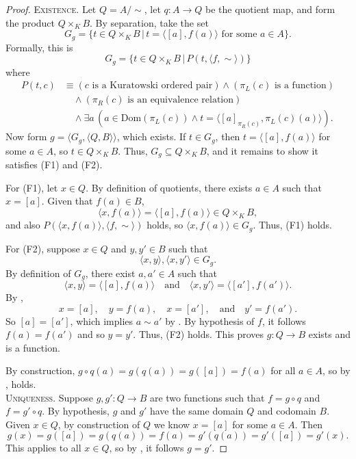 \begin{proof}
	\textsc{Existence.}
	Let $Q = A/\!\sim$, let $q:A\rightarrow Q$ be the quotient map, and form the product $Q\times_{K} B$.
	By separation, take the set
	\[ G_{g} = \{ t\in Q\times_{K} B \,|\, t = \langle [a], f(a)\rangle \text{ for some } a\in A \}. \]
	Formally, this is
	\[ G_{g} = \{ t\in Q\times_{K} B \,|\, P(t, \langle f, \sim\rangle) \} \]
	where 
	\begin{align*}
		P(t, c)&\equiv (c\text{ is a Kuratowski ordered pair})\land (\pi_{L}(c)\text{ is a function}) \\
		&\quad\land (\pi_{R}(c)\text{ is an equivalence relation}) \\
		&\quad\land \exists a\, (a\in\textrm{Dom}(\pi_{L}(c))\land t = \langle [a]_{\pi_{R}(c)}, \pi_{L}(c)(a)\rangle ). 
	\end{align*}
	Now form $g = \langle G_{g}, \langle Q, B\rangle\rangle$, which exists. 
	If $t\in G_{g}$, then $t = \langle [a], f(a)\rangle$ for some $a\in A$, so $t\in Q\times_{K} B$.
	Thus, $G_{g}\subseteq Q\times_{K}B$, and it remains to show it satisfies (F1) and (F2). 
	
	For (F1), let $x\in Q$.
	By definition of quotients, there exists $a\in A$ such that $x = [a]$. 
	Given that $f(a)\in B$, 
	\[ \langle x, f(a)\rangle = \langle [a], f(a)\rangle \in Q\times_{K} B, \]
	and also $P(\langle x, f(a)\rangle, \langle f, \sim\rangle)$ holds, so $\langle x, f(a)\rangle\in G_{g}$. 
	Thus, (F1) holds. 
	
	For (F2), suppose $x\in Q$ and $y, y'\in B$ such that
	\[ \langle x, y\rangle, \langle x, y'\rangle\in G_{g}. \]
	By definition of $G_{g}$, there exist $a, a'\in A$ such that
	\[ \langle x, y\rangle = \langle [a], f(a)\rangle \quad\text{and}\quad \langle x, y'\rangle = \langle [a'], f(a')\rangle. \]
	By , 
	\[ x = [a], \quad y = f(a), \quad x = [a'], \quad\text{and}\quad y' = f(a'). \]
	So $[a] = [a']$, which implies $a\sim a'$ by .
	By hypothesis of $f$, it follows $f(a) = f(a')$ and so $y = y'$. 
	Thus, (F2) holds. 
	This proves $g:Q\rightarrow B$ exists and is a function. 
	
	By construction, $g\circ q(a) = g(q(a)) = g([a]) = f(a)$ for all $a\in A$, so by ,   holds. \\
	
	\textsc{Uniqueness.}
	Suppose $g, g': Q \rightarrow B$ are two functions such that $f = g\circ q$ and $f = g'\circ q$. 
	By hypothesis, $g$ and $g'$ have the same domain $Q$ and codomain $B$. 
	Given $x\in Q$, by construction of $Q$ we know $x = [a]$ for some $a\in A$.
	Then 
	\[ g(x) = g([a]) = g(q(a)) = f(a) = g'(q(a)) = g'([a]) = g'(x). \]
	This applies to all $x\in Q$, so by , it follows $g = g'$. 
\end{proof}

